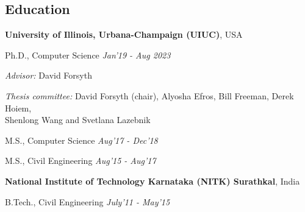 \documentclass[margin,line]{res}
\newenvironment{list1}{
  \begin{list}{\ding{113}}{%
      \setlength{\itemsep}{0in}
      \setlength{\parsep}{0in} \setlength{\parskip}{0in}
      \setlength{\topsep}{0in} \setlength{\partopsep}{0in} 
      \setlength{\leftmargin}{0.17in}}}{\end{list}}
\begin{document}
\begin{resume}
\section{\sc \large Education}
{\bf University of Illinois, Urbana-Champaign (UIUC)}, USA 
\\ \vspace*{-.12in}
\begin{list1}
\item[] Ph.D., Computer Science \hfill{\em Jan'19 - Aug 2023}
\item[] {\em Advisor:} David Forsyth \hfill {}
\item[] {\em Thesis committee:} David Forsyth (chair), Alyosha Efros, Bill Freeman,
 Derek Hoiem, \\ Shenlong Wang and  Svetlana Lazebnik  \hfill {}\\\vspace*{-.1in}
\item[] M.S., Computer Science \hfill{\em Aug'17 - Dec'18}
\item[] M.S., Civil Engineering \hfill{\em Aug'15 - Aug'17}
\end{list1}
{\bf National Institute of Technology Karnataka (NITK) Surathkal}, India
\\\vspace*{-.12in}
\begin{list1}
\item[] B.Tech., Civil Engineering \hfill{\em July'11 - May'15}
\end{list1}

\end{resume}
\end{document}

